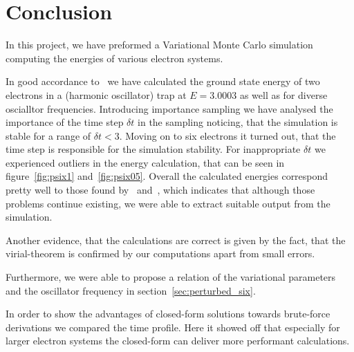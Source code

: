 \section{Conclusion}\label{sec:conclusion}
In this project, we have preformed a Variational Monte Carlo simulation computing the energies of various electron systems.

In good accordance to~\cite{hogberget2013} we have calculated the ground state energy of two electrons in a (harmonic oscillator) trap at $E=3.0003$ as well as for diverse oscialltor frequencies. Introducing importance sampling we have analysed the importance of the time step $\delta t$ in the sampling noticing, that the simulation is stable for a range of $\delta t < 3$. Moving on to six electrons it turned out, that the time step is responsible for the simulation stability. For inappropriate $\delta t$ we experienced outliers in the energy calculation, that can be seen in figure~\ref{fig:psix1} and~\ref{fig:psix05}. Overall the calculated energies correspond pretty well to those found by~\cite{hogberget2013} and~\cite{lohne2011}, which indicates that although those problems continue existing, we were able to extract suitable output from the simulation.

Another evidence, that the calculations are correct is given by the fact, that the virial-theorem is confirmed by our computations apart from small errors.

Furthermore, we were able to propose a relation of the variational parameters and the oscillator frequency in section~\ref{sec:perturbed_six}. 

In order to show the advantages of closed-form solutions towards brute-force derivations we compared the time profile. Here it showed off that especially for larger electron systems the closed-form can deliver more performant calculations. 